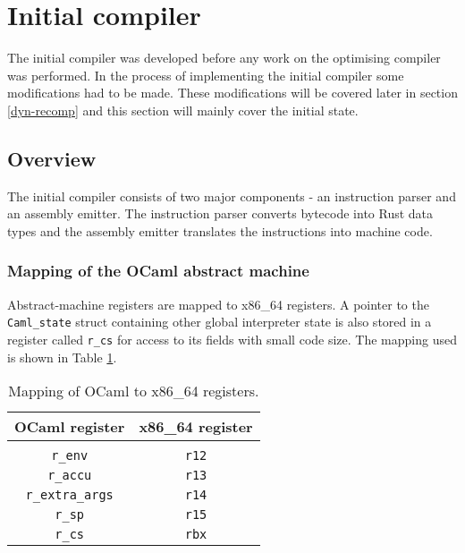 \section{Initial compiler}

The initial compiler was developed before any work on the optimising compiler was performed. In the
process of implementing the initial compiler some modifications had to be made. These modifications
will be covered later in section \ref{dyn-recomp} and this section will mainly cover the initial
state.

\subsection{Overview}

The initial compiler consists of two major components - an instruction parser and an assembly
emitter. The instruction parser converts bytecode into Rust data types and the assembly emitter
translates the instructions into machine code.

\subsubsection{Mapping of the OCaml abstract machine}

Abstract-machine registers are mapped to x86\_64 registers. A pointer to the \texttt{Caml\_state}
struct containing other global interpreter state is also stored in a register called \texttt{r\_cs}
for access to its fields with small code size. The mapping used is shown in Table
\ref{table:regmap}.

\begin{table}[h]
      \centering
      \begin{tabular}{cc}\toprule
            OCaml register          & x86\_64 register \\
            \midrule                                   \\
            \texttt{r\_env}         & \texttt{r12}     \\
            \texttt{r\_accu}        & \texttt{r13}     \\
            \texttt{r\_extra\_args} & \texttt{r14}     \\
            \texttt{r\_sp}          & \texttt{r15}     \\
            \texttt{r\_cs}          & \texttt{rbx}     \\
            \bottomrule
      \end{tabular}

      \caption{Mapping of OCaml to x86\_64 registers.}
      \label{table:regmap}
\end{table}

